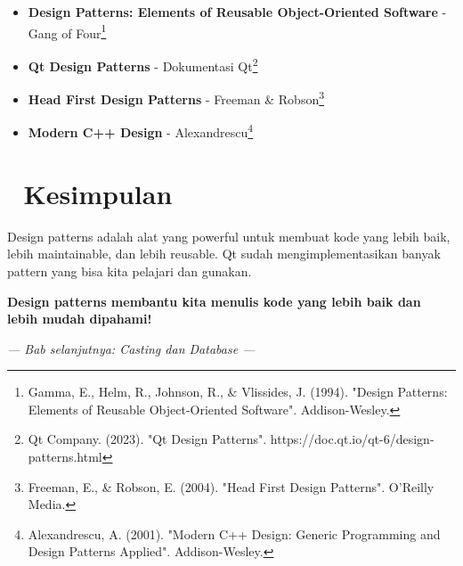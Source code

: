 \begin{itemize}
\item \textbf{Design Patterns: Elements of Reusable Object-Oriented Software} - Gang of Four\footnote{Gamma, E., Helm, R., Johnson, R., \& Vlissides, J. (1994). "Design Patterns: Elements of Reusable Object-Oriented Software". Addison-Wesley.}
\item \textbf{Qt Design Patterns} - Dokumentasi Qt\footnote{Qt Company. (2023). "Qt Design Patterns". https://doc.qt.io/qt-6/design-patterns.html}
\item \textbf{Head First Design Patterns} - Freeman \& Robson\footnote{Freeman, E., \& Robson, E. (2004). "Head First Design Patterns". O'Reilly Media.}
\item \textbf{Modern C++ Design} - Alexandrescu\footnote{Alexandrescu, A. (2001). "Modern C++ Design: Generic Programming and Design Patterns Applied". Addison-Wesley.}
\end{itemize}

\section{🎉 Kesimpulan}

Design patterns adalah alat yang powerful untuk membuat kode yang lebih baik, lebih maintainable, dan lebih reusable. Qt sudah mengimplementasikan banyak pattern yang bisa kita pelajari dan gunakan.

\begin{center}
\textbf{Design patterns membantu kita menulis kode yang lebih baik dan lebih mudah dipahami!} 🎨✨
\end{center}

\vspace{1cm}

\begin{center}
\textit{--- Bab selanjutnya: Casting dan Database ---}
\end{center} 